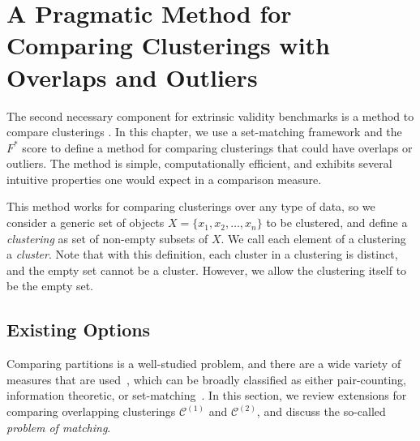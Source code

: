 \documentclass[review,los,12pt]{ryethesis}
\newcommand\cCone{\mathcal{C}^{(1)}}
\newcommand\cCtwo{\mathcal{C}^{(2)}}
\begin{document}
\chapter{A Pragmatic Method for Comparing Clusterings with Overlaps and Outliers}\label{chap:fstar}
The second necessary component for extrinsic validity benchmarks is a method to compare clusterings \cite{comparisonreview}.
In this chapter, we use a set-matching framework \cite{setmatching} and the $F^*$ score \cite{f*_hand} to define a method for comparing clusterings that could have overlaps or outliers.
The method is simple, computationally efficient, and exhibits several intuitive properties one would expect in a comparison measure.

This method works for comparing clusterings over any type of data, so we consider a generic set of objects $X = \{x_1, x_2, \ldots, x_n\}$ to be clustered, and define a \textit{clustering} as set of non-empty subsets of $X$.
We call each element of a clustering a \textit{cluster}.
Note that with this definition, each cluster in a clustering is distinct, and the empty set cannot be a cluster.
However, we allow the clustering itself to be the empty set.

\section{Existing Options}\label{sec:related}
Comparing partitions is a well-studied problem, and there are a wide variety of measures that are used~\cite{comparisonreview}, which can be broadly classified as either pair-counting, information theoretic, or set-matching~\cite{setmatching}.
In this section, we review extensions for comparing overlapping clusterings $\cCone$ and $\cCtwo$, and discuss the so-called \textit{problem of matching}.
\end{document}
